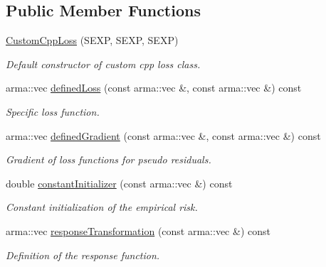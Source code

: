 \subsection*{Public Member Functions}
\begin{DoxyCompactItemize}
\item 
\mbox{\hyperlink{classloss_1_1_custom_cpp_loss_a0616bfb4c640c63a4307d039b32079d1}{Custom\+Cpp\+Loss}} (S\+E\+XP, S\+E\+XP, S\+E\+XP)
\begin{DoxyCompactList}\small\item\em Default constructor of custom cpp loss class. \end{DoxyCompactList}\item 
arma\+::vec \mbox{\hyperlink{classloss_1_1_custom_cpp_loss_a5611805b67b0542449beb898051ab943}{defined\+Loss}} (const arma\+::vec \&, const arma\+::vec \&) const
\begin{DoxyCompactList}\small\item\em Specific loss function. \end{DoxyCompactList}\item 
arma\+::vec \mbox{\hyperlink{classloss_1_1_custom_cpp_loss_a3ff741b3a4d4c3f3515660dcb7b32781}{defined\+Gradient}} (const arma\+::vec \&, const arma\+::vec \&) const
\begin{DoxyCompactList}\small\item\em Gradient of loss functions for pseudo residuals. \end{DoxyCompactList}\item 
double \mbox{\hyperlink{classloss_1_1_custom_cpp_loss_a7e3691161855a4a3152982274e74c96a}{constant\+Initializer}} (const arma\+::vec \&) const
\begin{DoxyCompactList}\small\item\em Constant initialization of the empirical risk. \end{DoxyCompactList}\item 
arma\+::vec \mbox{\hyperlink{classloss_1_1_custom_cpp_loss_a8ef296a7db08423f68dd389824b5aa77}{response\+Transformation}} (const arma\+::vec \&) const
\begin{DoxyCompactList}\small\item\em Definition of the response function. \end{DoxyCompactList}\end{DoxyCompactItemize}
